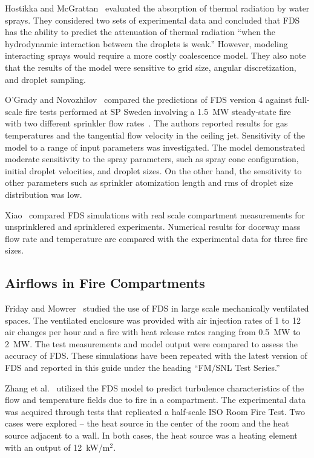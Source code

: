 Hostikka  and  McGrattan~\cite{Hostikka:FSJ2006}  evaluated  the absorption of thermal radiation by water sprays. They considered two sets of experimental data and concluded that FDS has the ability to predict the attenuation of thermal radiation ``when the hydrodynamic interaction between  the droplets is  weak.'' However, modeling interacting sprays would require a more costly coalescence model. They also note that the results of the model were sensitive to grid size, angular discretization, and droplet sampling.

O'Grady and Novozhilov~\cite{OGrady:CST} compared the predictions of FDS version 4 against full-scale fire tests performed at SP Sweden involving a 1.5~MW steady-state fire with two different sprinkler flow rates~\cite{Ingason:1}. The authors reported results for gas temperatures and the tangential flow velocity in the ceiling jet. Sensitivity of the model to a range of input parameters was investigated. The model demonstrated moderate sensitivity to the spray parameters, such as spray cone configuration, initial droplet velocities, and droplet sizes. On the other hand, the sensitivity to other parameters such as sprinkler atomization length and rms of droplet size distribution was low.

Xiao~\cite{Xiao:FT2012} compared FDS simulations with real scale compartment measurements for unsprinklered and sprinklered experiments. Numerical results for doorway mass flow rate and temperature are compared with the experimental data for three fire sizes.



\subsection{Airflows in Fire Compartments}

Friday and Mowrer~\cite{Friday:1} studied the use of FDS in large scale mechanically ventilated spaces.  The ventilated enclosure was provided with air injection rates of 1 to 12 air changes per hour and a fire with heat release rates ranging from 0.5~MW to 2~MW. The test measurements and model output were compared to assess the accuracy of FDS. These simulations have been repeated with the latest version of FDS and reported in this guide under the heading ``FM/SNL Test Series.''

Zhang et al.~\cite{Zhang:2} utilized the FDS model to predict turbulence characteristics of the flow and temperature fields due to fire in a compartment.  The experimental data was acquired through tests that replicated a half-scale ISO Room Fire Test. Two cases were explored -- the heat source in the center of the room and the heat source adjacent to a wall. In both cases, the heat source was a heating element with an output of 12~kW/m$^2$.


